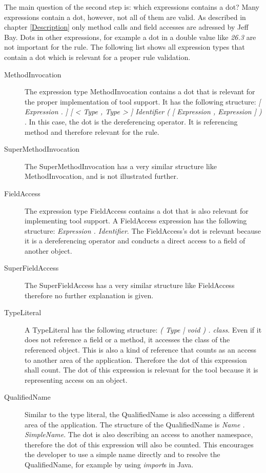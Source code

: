 The main question of the second step is: which expressions contains a dot? Many expressions contain a dot, however, not all of them are valid. As described in chapter \ref{Description} only method calls and field accesses are adressed by Jeff Bay. Dots in other expressions, for example a dot in a double value like \textit{26.3} are not important for the rule. The following list shows all expression types that contain a dot which is relevant for a proper rule validation. 
\begin{description}
  \item[MethodInvocation] The expression type MethodInvocation contains a dot that is relevant for the proper implementation of tool support. It has the following structure: \textit{[ Expression . ] [ < Type { , Type } > ] Identifier ( [ Expression { , Expression } ] ) }. In this case, the dot is the dereferencing operator. It is referencing method and therefore relevant for the rule.
  \item[SuperMethodInvocation] The SuperMethodInvocation has a very similar structure like MethodInvocation, and is not illustrated further.
  \item[FieldAccess] The expression type FieldAccess contains a dot that is also relevant for implementing tool support. A FieldAccess expression has the following structure: \textit{Expression . Identifier}. The FieldAccess's dot is relevant because it is a dereferencing operator and conducts a direct access to a field of another object.
  \item[SuperFieldAccess] The SuperFieldAccess has a very similar structure like FieldAccess therefore no further explanation is given.
  \item[TypeLiteral] A TypeLiteral has the following structure: \textit{( Type | void ) . class}. Even if it does not reference a field or a method, it accesses the class of the referenced object. This is also a kind of reference that counts as an access to another area of the application. Therefore the dot of this expression shall count. The dot of this expression is relevant for the tool because it is representing access on an object.
  \item[QualifiedName] Similar to the type literal, the QualifiedName is also accessing a different area of the application. The structure of the QualifiedName is \textit{Name . SimpleName}. The dot is also describing an access to another namespace, therefore the dot of this expression will also be counted. This encourages the developer to use a simple name directly and to resolve the QualifiedName, for example by using \textit{import}s in Java.
\end{description}

